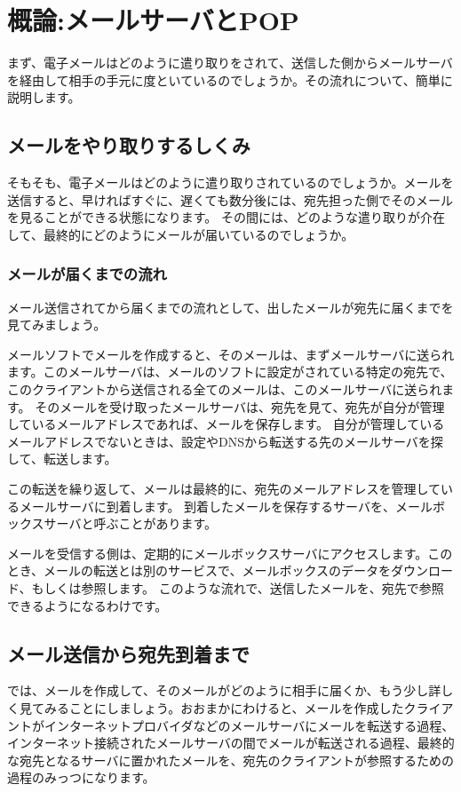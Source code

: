 \chapter{概論:メールサーバとPOP}

まず、電子メールはどのように遣り取りをされて、送信した側からメールサーバを経由して相手の手元に度といているのでしょうか。その流れについて、簡単に説明します。

\section{メールをやり取りするしくみ}

そもそも、電子メールはどのように遣り取りされているのでしょうか。メールを送信すると、早ければすぐに、遅くても数分後には、宛先担った側でそのメールを見ることができる状態になります。
その間には、どのような遣り取りが介在して、最終的にどのようにメールが届いているのでしょうか。

\subsection{メールが届くまでの流れ}

メール送信されてから届くまでの流れとして、出したメールが宛先に届くまでを見てみましょう。

メールソフトでメールを作成すると、そのメールは、まずメールサーバに送られます。このメールサーバは、メールのソフトに設定がされている特定の宛先で、このクライアントから送信される全てのメールは、このメールサーバに送られます。
そのメールを受け取ったメールサーバは、宛先を見て、宛先が自分が管理しているメールアドレスであれば、メールを保存します。
自分が管理しているメールアドレスでないときは、設定やDNSから転送する先のメールサーバを探して、転送します。

この転送を繰り返して、メールは最終的に、宛先のメールアドレスを管理しているメールサーバに到着します。
到着したメールを保存するサーバを、メールボックスサーバと呼ぶことがあります。

メールを受信する側は、定期的にメールボックスサーバにアクセスします。このとき、メールの転送とは別のサービスで、メールボックスのデータをダウンロード、もしくは参照します。
このような流れで、送信したメールを、宛先で参照できるようになるわけです。

\section{メール送信から宛先到着まで}

では、メールを作成して、そのメールがどのように相手に届くか、もう少し詳しく見てみることにしましょう。おおまかにわけると、メールを作成したクライアントがインターネットプロバイダなどのメールサーバにメールを転送する過程、インターネット接続されたメールサーバの間でメールが転送される過程、最終的な宛先となるサーバに置かれたメールを、宛先のクライアントが参照するための過程のみっつになります。

